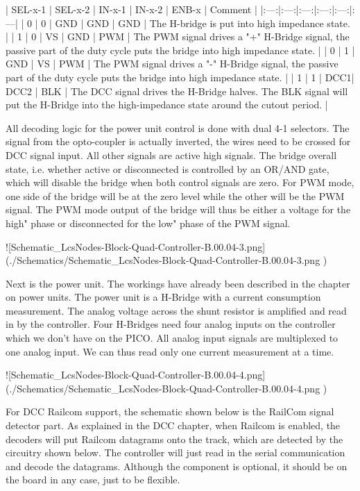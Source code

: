 | SEL-x-1 | SEL-x-2 | IN-x-1 | IN-x-2 | ENB-x | Comment |
|:---:|:---:|:---:|:---:|:---:|:---|
| 0 | 0 | GND | GND | GND | The H-bridge is put into high impedance state. |
| 1 | 0 | VS | GND | PWM | The PWM signal drives a "+" H-Bridge signal, the passive part of the duty cycle puts the bridge into high impedance state. |
| 0 | 1 | GND | VS | PWM | The PWM signal drives a "-" H-Bridge signal, the passive part of the duty cycle puts the bridge into high impedance state. |
| 1 | 1 | DCC1| DCC2 | BLK | The DCC signal drives the H-Bridge halves. The BLK signal will put the H-Bridge into the high-impedance state around the cutout period. |

All decoding logic for the power unit control is done with dual 4-1 selectors. The signal from the opto-coupler is actually inverted, the wires need to be crossed for DCC signal input. All other signals are active high signals. The bridge overall state, i.e. whether active or disconnected is controlled by an OR/AND gate, which will disable the bridge when both control signals are zero. For PWM mode, one side of the bridge will be at the zero level while the other will be the PWM signal. The PWM mode output of the bridge will thus be either a voltage for the high" phase or disconnected for the low" phase of the PWM signal.

![Schematic_LcsNodes-Block-Quad-Controller-B.00.04-3.png](./Schematics/Schematic_LcsNodes-Block-Quad-Controller-B.00.04-3.png )

Next is the power unit. The workings have already been described in the chapter on power units. The power unit is a H-Bridge with a current consumption measurement. The analog voltage across the shunt resistor is amplified and read in by the controller. Four H-Bridges need four analog inputs on the controller which we don't have on the PICO. All analog input signals are multiplexed to one analog input. We can thus read only one current measurement at a time.

![Schematic_LcsNodes-Block-Quad-Controller-B.00.04-4.png](./Schematics/Schematic_LcsNodes-Block-Quad-Controller-B.00.04-4.png )

For DCC Railcom support, the schematic shown below is the RailCom signal detector part. As explained in the DCC chapter, when Railcom is enabled, the decoders will put Railcom datagrams onto the track, which are detected by the circuitry shown below. The controller will just read in the serial communication and decode the datagrams. Although the component is optional, it should be on the board in any case, just to be flexible.

